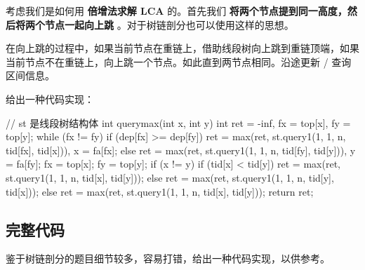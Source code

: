 考虑我们是如何用 \textbf{倍增法求解 LCA} 的。首先我们 \textbf{将两个节点提到同一高度，然后将两个节点一起向上跳} 。对于树链剖分也可以使用这样的思想。

在向上跳的过程中，如果当前节点在重链上，借助线段树向上跳到重链顶端，如果当前节点不在重链上，向上跳一个节点。如此直到两节点相同。沿途更新 / 查询区间信息。

给出一种代码实现：

\begin{cppcode}
// st 是线段树结构体
int querymax(int x, int y) {
  int ret = -inf, fx = top[x], fy = top[y];
  while (fx != fy) {
    if (dep[fx] >= dep[fy])
      ret = max(ret, st.query1(1, 1, n, tid[fx], tid[x])), x = fa[fx];
    else
      ret = max(ret, st.query1(1, 1, n, tid[fy], tid[y])), y = fa[fy];
    fx = top[x];
    fy = top[y];
  }
  if (x != y) {
    if (tid[x] < tid[y])
      ret = max(ret, st.query1(1, 1, n, tid[x], tid[y]));
    else
      ret = max(ret, st.query1(1, 1, n, tid[y], tid[x]));
  } else
    ret = max(ret, st.query1(1, 1, n, tid[x], tid[y]));
  return ret;
}
\end{cppcode}

\subsection{完整代码}

鉴于树链剖分的题目细节较多，容易打错，给出一种代码实现，以供参考。

